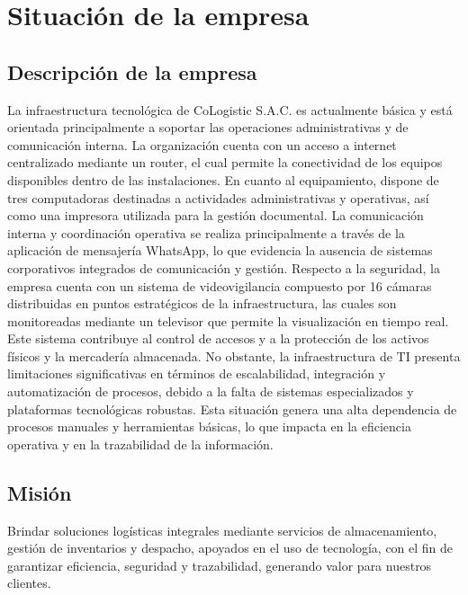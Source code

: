 \documentclass[11pt]{article}
\begin{document}
\newpage
{}
\thispagestyle{plain}
\tableofcontents
\newpage

\setcounter{page}{1}

\section{Situación de la empresa}

\subsection{Descripción de la empresa}

La infraestructura tecnológica de CoLogistic S.A.C. es actualmente
básica y está orientada principalmente a soportar las operaciones
administrativas y de comunicación interna. La organización cuenta con un
acceso a internet centralizado mediante un router, el cual permite la
conectividad de los equipos disponibles dentro de las instalaciones. En
cuanto al equipamiento, dispone de tres computadoras destinadas a
actividades administrativas y operativas, así como una impresora
utilizada para la gestión documental. La comunicación interna y
coordinación operativa se realiza principalmente a través de la
aplicación de mensajería WhatsApp, lo que evidencia la ausencia de
sistemas corporativos integrados de comunicación y gestión. Respecto a
la seguridad, la empresa cuenta con un sistema de videovigilancia
compuesto por 16 cámaras distribuidas en puntos estratégicos de la
infraestructura, las cuales son monitoreadas mediante un televisor que
permite la visualización en tiempo real. Este sistema contribuye al
control de accesos y a la protección de los activos físicos y la
mercadería almacenada. No obstante, la infraestructura de TI presenta
limitaciones significativas en términos de escalabilidad, integración y
automatización de procesos, debido a la falta de sistemas especializados
y plataformas tecnológicas robustas. Esta situación genera una alta
dependencia de procesos manuales y herramientas básicas, lo que impacta
en la eficiencia operativa y en la trazabilidad de la información.

\subsection{Misión}

Brindar soluciones logísticas integrales mediante servicios de
almacenamiento, gestión de inventarios y despacho, apoyados en el uso de
tecnología, con el fin de garantizar eficiencia, seguridad y
trazabilidad, generando valor para nuestros clientes.
\end{document}
